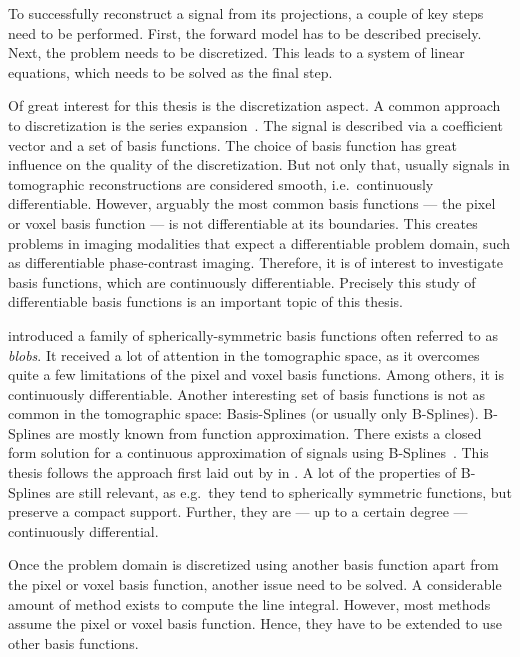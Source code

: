 To successfully reconstruct a signal from its projections, a couple of key steps need to be
performed. First, the forward model has to be described precisely. Next, the problem needs to be
discretized. This leads to a system of linear equations, which needs to be solved as the final step.

Of great interest for this thesis is the discretization aspect. A common approach to discretization
is the series expansion~\cite{herman_basis_2015}. The signal is described via a coefficient vector
and a set of basis functions. The choice of basis function has great influence on the quality of the
discretization. But not only that, usually signals in tomographic reconstructions are considered
smooth, i.e.\ continuously differentiable. However, arguably the most common basis functions --- the
pixel or voxel basis function --- is not differentiable at its boundaries. This creates problems in
imaging modalities that expect a differentiable problem domain, such as differentiable
phase-contrast imaging. Therefore, it is of interest to investigate basis functions, which are
continuously differentiable. Precisely this study of differentiable basis functions is an important
topic of this thesis.

\citeauthor*{lewitt_multidimensional_1990} introduced a family of spherically-symmetric basis
functions often referred to as \textit{blobs}. It received a lot of attention in the tomographic
space, as it overcomes quite a few limitations of the pixel and voxel basis functions. Among others,
it is continuously differentiable. Another interesting set of basis functions is not as common in
the tomographic space: Basis-Splines (or usually only B-Splines). B-Splines are mostly known from
function approximation. There exists a closed form solution for a continuous approximation of
signals using B-Splines~\cite{unser_fast_1991}. This thesis follows the approach first laid out by
\citeauthor*{momey_new_2011} in \cite{momey_new_2011}. A lot of the properties of B-Splines are
still relevant, as e.g.\ they tend to spherically symmetric functions, but preserve a compact
support. Further, they are --- up to a certain degree --- continuously differential.

Once the problem domain is discretized using another basis function apart from the pixel or
voxel basis function, another issue need to be solved. A considerable amount of method exists to
compute the line integral. However, most methods assume the pixel or voxel basis function. Hence,
they have to be extended to use other basis functions.

